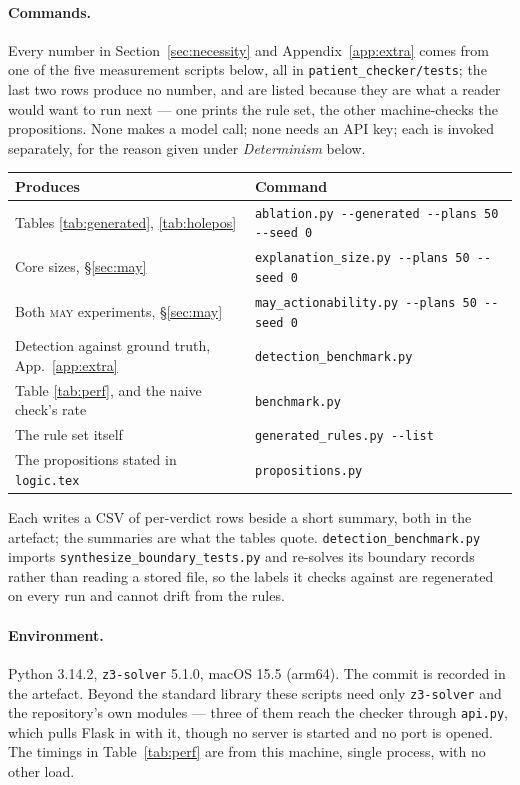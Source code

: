 \documentclass{article}
\begin{document}
\paragraph{Commands.}
Every number in Section~\ref{sec:necessity} and Appendix~\ref{app:extra} comes
from one of the five measurement scripts below, all in
\texttt{patient\_checker/tests}; the last two rows produce no number, and are
listed because they are what a reader would want to run next --- one prints the
rule set, the other machine-checks the propositions. None makes a model call;
none needs an API key; each is invoked separately, for the reason given under
\emph{Determinism} below.
\begin{center}
\begin{tabular}{ll}
  \toprule
  Produces & Command \\
  \midrule
  Tables \ref{tab:generated}, \ref{tab:holepos}
    & \texttt{ablation.py -{}-generated -{}-plans 50 -{}-seed 0} \\
  Core sizes, \S\ref{sec:may}
    & \texttt{explanation\_size.py -{}-plans 50 -{}-seed 0} \\
  Both \textsc{may} experiments, \S\ref{sec:may}
    & \texttt{may\_actionability.py -{}-plans 50 -{}-seed 0} \\
  Detection against ground truth, App.~\ref{app:extra}
    & \texttt{detection\_benchmark.py} \\
  Table \ref{tab:perf}, and the naive check's rate
    & \texttt{benchmark.py} \\
  The rule set itself
    & \texttt{generated\_rules.py -{}-list} \\
  \addlinespace
  The propositions stated in \texttt{logic.tex}
    & \texttt{propositions.py} \\
  \bottomrule
\end{tabular}
\end{center}
Each writes a CSV of per-verdict rows beside a short summary, both in the
artefact; the summaries are what the tables quote.
\texttt{detection\_benchmark.py} imports \texttt{synthesize\_boundary\_tests.py}
and re-solves its boundary records rather than reading a stored file, so the
labels it checks against are regenerated on every run and cannot drift from the
rules.

\paragraph{Environment.}
Python 3.14.2, \texttt{z3-solver} 5.1.0, macOS 15.5 (arm64). The commit is
recorded in the artefact. Beyond the standard library these scripts need only
\texttt{z3-solver} and the repository's own modules --- three of them reach the
checker through \texttt{api.py}, which pulls Flask in with it, though no server
is started and no port is opened. The timings in Table~\ref{tab:perf} are from
this machine, single process, with no other load.
\end{document}
